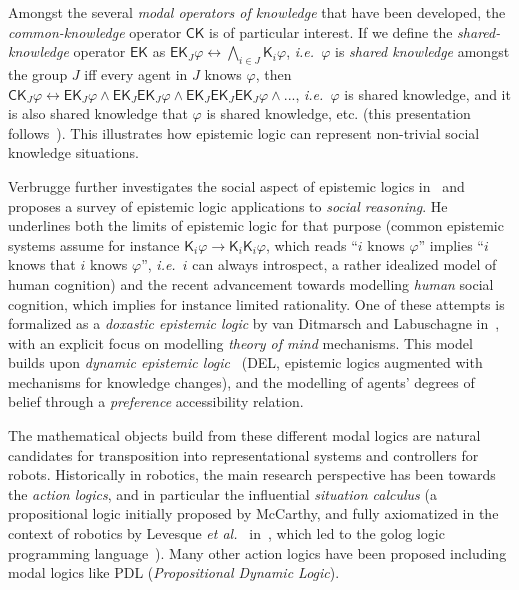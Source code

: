 \documentclass{sig-alternate}
\newcommand{\etal}{{\textit{et al.~}}}
\newcommand{\ie}{{\textit{i.e.~}}}
\begin{document}
Amongst the several \emph{modal operators of knowledge} that have been
developed, the \emph{common-knowledge} operator $\mathsf{CK}$ is of particular
interest. If we define the \emph{shared-knowledge} operator $\mathsf{EK}$ as
$\mathsf{EK}_J\varphi \leftrightarrow \bigwedge_{i \in J}\mathsf{K}_i\varphi$,
\ie $\varphi$ is \emph{shared knowledge} amongst the group $J$ iff every agent
in $J$ knows $\varphi$, then $\mathsf{CK}_J\varphi \leftrightarrow
\mathsf{EK}_J\varphi \wedge \mathsf{EK}_J\mathsf{EK}_J\varphi \wedge
\mathsf{EK}_J\mathsf{EK}_J\mathsf{EK}_J\varphi \wedge ...$, \ie $\varphi$ is
shared knowledge, and it is also shared knowledge that $\varphi$ is shared
knowledge, etc. (this presentation follows~\cite{herzig2014logics}). This
illustrates how epistemic logic can represent non-trivial social knowledge
situations.

Verbrugge further investigates the social aspect of epistemic logics
in~\cite{verbrugge2009logic} and proposes a survey of epistemic logic
applications to \emph{social reasoning}. He underlines both the limits of
epistemic logic for that purpose (common epistemic systems assume for instance
$\mathsf{K}_{i}\varphi \rightarrow \mathsf{K}_{i}\mathsf{K}_{i}\varphi$, which
reads ``$i$ knows $\varphi$'' implies ``$i$ knows that $i$ knows $\varphi$'',
\ie $i$ can always introspect, a rather idealized model of human cognition) and
the recent advancement towards modelling \emph{human} social cognition, which
implies for instance limited rationality.  One of these attempts is formalized
as a \emph{doxastic epistemic logic} by van Ditmarsch and Labuschagne
in~\cite{ditmarsch2007beliefs}, with an explicit focus on modelling \emph{theory
of mind} mechanisms. This model builds upon \emph{dynamic epistemic
logic}~\cite{ditmarsch2007dynamic} (DEL, epistemic logics augmented with
mechanisms for knowledge changes), and the modelling of agents' degrees of
belief through a \emph{preference} accessibility relation.

The mathematical objects build from these different modal logics are natural
candidates for transposition into representational systems and controllers for
robots. Historically in robotics, the main research perspective has been towards
the \emph{action logics}, and in particular the influential \emph{situation
calculus} (a propositional logic initially proposed by McCarthy, and fully
axiomatized in the context of robotics by Levesque \etal
in~\cite{levesque1998foundations}, which led to the {\sc golog} logic
programming language~\cite{levesque1997golog}).  Many other action logics have
been proposed including modal logics like PDL (\emph{Propositional Dynamic
Logic}).
\end{document}

